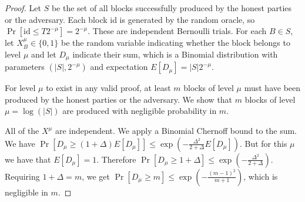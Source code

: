 \begin{proof}

    Let $S$ be the set of all blocks successfully produced by the honest
    parties or the adversary. Each block id is generated by the random
    oracle, so $\Pr[\text{id} \leq T 2^{-\mu}] = 2^{-\mu}$. These are
    independent Bernoulli trials. For each $B \in S$, let $X^{\mu}_B
    \in \{0, 1\}$ be the random variable indicating whether the block belongs
    to level $\mu$ and let $D_\mu$ indicate their sum, which is a
    Binomial distribution with parameters $(|S|, 2^{-\mu})$ and expectation
    $E[D_{\mu}] = |S| 2^{-\mu}$.

    For level $\mu$ to exist in any valid proof, at least $m$ blocks of level
    $\mu$ must have been produced by the honest parties or the adversary. We
    show that $m$ blocks of level $\mu = \log(|S|)$ are produced with
    negligible probability in $m$.

    All of the $X^{\mu}$ are independent. We apply a Binomial Chernoff
    bound to the sum. We have
    $\Pr[D_\mu \geq (1 + \Delta)E[D_\mu]] \leq \exp(-\frac{\Delta^2}{2 +
    \Delta}E[D_\mu])$. But for this $\mu$ we have that $E[D_\mu] = 1$.
    Therefore $\Pr[D_\mu \geq 1 + \Delta] \leq \exp(-\frac{\Delta^2}{2 +
    \Delta})$. Requiring $1 + \Delta = m$, we get $\Pr[D_\mu \geq m] \leq
    \exp(-\frac{(m - 1)^2}{m + 1})$, which is negligible in $m$.
    \Qed
\end{proof}
